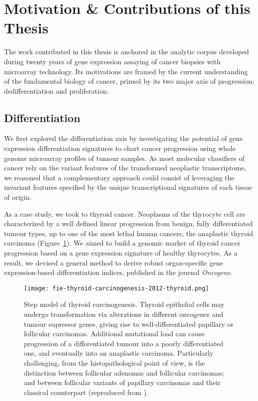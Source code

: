 \section{Motivation \& Contributions of this Thesis}

The work contributed in this thesis is anchored in the analytic corpus developed
during twenty years of gene expression assaying of cancer biopsies with
microarray technology.  Its motivations are framed by the current understanding
of the fundamental biology of cancer, primed by its two major axis of
progression: dedifferentiation and proliferation.

\subsection{Differentiation}
We first explored the differentiation axis by investigating the potential of
gene expression differentiation signatures to chart cancer progression using
whole genome microarray profiles of tumour samples.  As most molecular
classifiers of cancer rely on the variant features of the transformed neoplastic
transcriptome, we reasoned that a complementary approach could consist of
leveraging the invariant features specified by the unique transcriptional
signatures of each tissue of origin.

As a case study, we took to thyroid cancer.  Neoplasms of the thyrocyte cell are
characterized by a well defined linear progression from benign, fully
differentiated tumour types, up to one of the most lethal human cancers, the
anaplastic thyroid carcinoma (Figure~\ref{fig:thyroid-carcinogenesis}).  We
aimed to build a genomic marker of thyroid cancer progression based on a gene
expression signature of healthy thyrocytes.  As a result, we devised a general
method to derive robust \mbox{organ-specific} gene \mbox{expression-based}
differentiation indices, published in the journal
\emph{Oncogene}.\cite{tomas_general_2012}

\begin{figure}[ht]
  \texttt{[image: fie-thyroid-carcinogenesis-2012-thyroid.png]}%
  \caption[Step model of thyroid carcinogenesis]{Step model of thyroid
    carcinogenesis.  Thyroid epithelial cells may undergo transformation via
    alterations in different oncogenes and tumour supressor genes, giving rise
    to \mbox{well-differentiated} papillary or follicular carcinomas.
    Additional mutational load can cause progression of a differentiated tumour
    into a poorly differentiated one, and eventually into an anaplastic
    carcinoma.  Particularly challenging, from the histopathological point of
    view, is the distinction between follicular adenomas and follicular
    carcinomas; and between follicular variants of papillary carcinomas and
    their classical counterpart (reproduced from
    \citealp{sastre-perona_role_2012}).}
  \label{fig:thyroid-carcinogenesis}
\end{figure}

